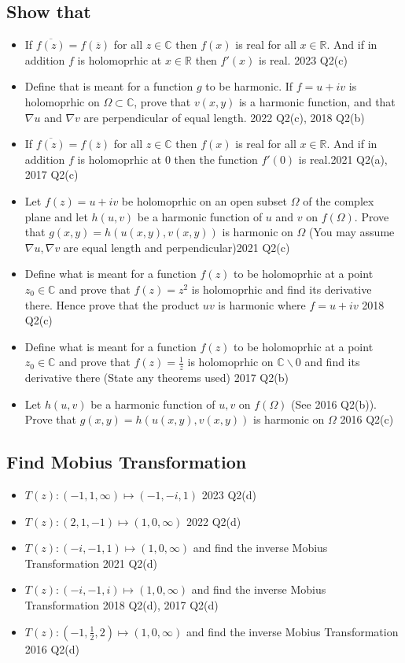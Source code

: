 \documentclass[a4paper, 8pt]{extarticle}
\begin{document}
\subsection{Show that}
\begin{itemize}
    \item If $\overline{f(z)} = f(\overline{z})$ for all $z \in \mathbb{C}$ then $f(x)$ is real for all $x \in \mathbb{R}$. And if in addition $f$ is holomoprhic at $x \in \mathbb{R}$ then $f'(x)$ is real. \hfill 2023 Q2(c)
    \item Define that is meant for a function $g$ to be harmonic. If $f = u +iv$ is holomoprhic on $\Omega \subset \mathbb{C}$, prove that $v(x,y)$ is a harmonic function, and that $\nabla u$ and $\nabla v$ are perpendicular of equal length. \hfill 2022 Q2(c), 2018 Q2(b)
    \item If $\overline{f(z)} = f(\overline{z})$ for all $z \in \mathbb{C}$ then $f(x)$ is real for all $x \in \mathbb{R}$. And if in addition $f$ is holomoprhic at $0$ then the function $f'(0)$ is real.\hfill 2021 Q2(a), 2017 Q2(c)
    \item Let $f(z) = u +iv$ be holomoprhic on an open subset $\Omega$ of the complex plane and let $h(u,v)$ be a harmonic function of $u$ and $v$ on $f(\Omega)$. Prove that $g(x,y) = h(u(x,y), v(x,y))$ is harmonic on $\Omega$ (You may assume $\nabla u, \nabla v$ are equal length and perpendicular)\hfill 2021 Q2(c)
    \item Define what is meant for a function $f(z)$ to be holomoprhic at a point $z_0 \in \mathbb{C}$ and prove that $f(z) = z^2$ is holomoprhic and find its derivative there. Hence prove that the product $uv$ is harmonic where $f=u +iv$ \hfill 2018 Q2(c)
    \item Define what is meant for a function $f(z)$ to be holomoprhic at a point $z_0 \in \mathbb{C}$ and prove that $f(z) = \frac{1}{z}$ is holomoprhic on $\mathbb{C} \backslash 0$ and find its derivative there (State any theorems used) \hfill 2017 Q2(b)
    \item Let $h(u,v)$ be a harmonic function of $u, v$ on $f(\Omega)$ (See 2016 Q2(b)). Prove that $g(x,y) = h(u(x,y), v(x,y))$ is harmonic on $\Omega$ \hfill 2016 Q2(c)
\end{itemize}
\subsection{Find Mobius Transformation}
\begin{itemize}
    \item $T(z) : (-1, 1, \infty) \mapsto (-1, -i, 1)$ \hfill 2023 Q2(d)
    \item $T(z) : (2, 1, -1) \mapsto (1, 0, \infty)$    \hfill 2022 Q2(d)
    \item $T(z) : (-i, -1, 1) \mapsto (1, 0, \infty)$ and find the inverse Mobius Transformation \hfill 2021 Q2(d)
    \item $T(z) : (-i, -1, i) \mapsto (1, 0, \infty)$ and find the inverse Mobius Transformation \hfill 2018 Q2(d), 2017 Q2(d)
    \item $T(z) : (-1, \frac{1}{2}, 2) \mapsto (1, 0, \infty)$ and find the inverse Mobius Transformation \hfill 2016 Q2(d)
\end{itemize}
\end{document}
